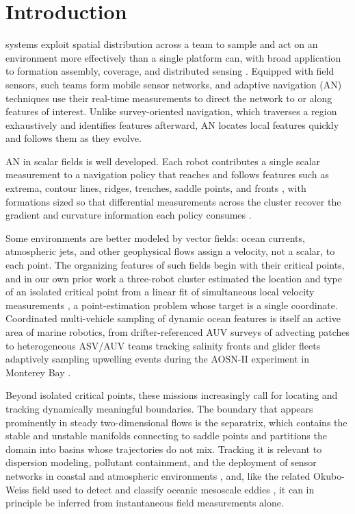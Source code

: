 \documentclass[lettersize,journal]{IEEEtran}
\begin{document}
\section{Introduction}
\label{sec:intro}

 systems exploit spatial distribution across a team to sample
and act on an environment more effectively than a single platform can,
with broad application to formation assembly, coverage, and distributed
sensing \cite{1}. Equipped with field sensors, such teams form mobile
sensor networks, and adaptive navigation (AN) techniques use their
real-time measurements to direct the network to or along features of
interest. Unlike survey-oriented navigation, which traverses a region
exhaustively and identifies features afterward, AN locates local
features quickly and follows them as they evolve.

AN in scalar fields is well developed. Each robot contributes a single
scalar measurement to a navigation policy that reaches and follows
features such as extrema, contour lines, ridges, trenches, saddle
points, and fronts \cite{26,27,28,29}, with formations sized so that
differential measurements across the cluster recover the gradient and
curvature information each policy consumes \cite{15,26}.

Some environments are better modeled by vector fields: ocean currents,
atmospheric jets, and other geophysical flows assign a velocity, not a
scalar, to each point. The organizing features of such fields begin
with their critical points, and in our own prior work a three-robot
cluster estimated the location and type of an isolated critical point
from a linear fit of simultaneous local velocity measurements
\cite{14}, a point-estimation problem whose target is a single
coordinate. Coordinated multi-vehicle sampling of dynamic ocean
features is itself an active area of marine robotics, from
drifter-referenced AUV surveys of advecting patches \cite{2} to
heterogeneous ASV/AUV teams tracking salinity fronts \cite{3} and
glider fleets adaptively sampling upwelling events during the AOSN-II
experiment in Monterey Bay \cite{4}.

Beyond isolated critical points, these missions increasingly call for
locating and tracking dynamically meaningful boundaries. The boundary
that appears prominently in steady two-dimensional flows is the
separatrix, which contains the stable and unstable manifolds connecting
to saddle points and partitions the domain into basins whose
trajectories do not mix. Tracking it is relevant to dispersion
modeling, pollutant containment, and the deployment of sensor networks
in coastal and atmospheric environments \cite{6,7,8}, and, like the
related Okubo-Weiss field used to detect and classify oceanic mesoscale
eddies \cite{5}, it can in principle be inferred from instantaneous
field measurements alone.
\end{document}
